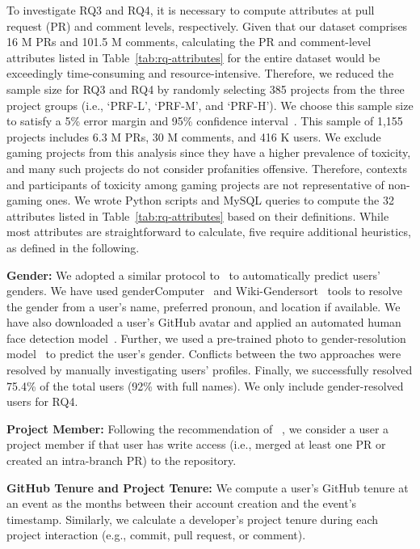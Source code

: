 To investigate RQ3 and RQ4, it is necessary to compute attributes at pull request (PR) and comment levels, respectively. Given that our dataset comprises 16 M PRs and 101.5 M comments, calculating the PR and comment-level attributes listed in Table~\ref{tab:rq-attributes} 
for the entire dataset would be exceedingly time-consuming and resource-intensive. Therefore, we reduced the sample size for RQ3 and RQ4 by randomly selecting 385 projects from the three project groups (i.e., `PRF-L', `PRF-M', and `PRF-H'). 
We choose this sample size to satisfy a 5\% error margin and 95\% confidence interval~\cite{cochran1977sampling}. This sample of 1,155 projects includes 6.3 M PRs, 30 M comments, and 416 K users. We exclude gaming projects from this analysis since they have a higher prevalence of toxicity, and many such projects do not consider profanities offensive. Therefore, contexts and participants of toxicity among gaming projects are not representative of non-gaming ones.
We wrote Python scripts and MySQL queries to compute the 32 attributes listed in Table~\ref{tab:rq-attributes} based on their definitions. While most attributes are straightforward to calculate, five require additional heuristics, as defined in the following.


    \textbf{Gender: }
    We adopted a similar protocol to~\citet{sultana2022code} to automatically predict users' genders. We have used genderComputer~\cite{vasilescu2014gender} and Wiki-Gendersort~\cite{berube2020wiki} tools to resolve the gender from a user's name, preferred pronoun, and location if available. We have also downloaded a user's GitHub avatar and applied an automated human face detection model~\cite{goyal2017face}. Further, we used a pre-trained photo to gender-resolution model~\cite{eidinger2014age} to predict the user's gender. Conflicts between the two approaches were resolved by manually investigating users' profiles.
 Finally, we successfully resolved 75.4\% of the total users (92\% with full names). We only include gender-resolved users for RQ4. 

 \textbf {Project Member:}
 Following the recommendation of ~\citet{gousios2012ghtorrent}, we consider a user a project member if that user has write access (i.e., merged at least one PR or created an intra-branch PR) to the repository.


 \textbf{GitHub Tenure and Project Tenure:}
We compute a user's GitHub tenure at an event as the months between their account creation and the event's timestamp. Similarly, we calculate a developer's project tenure during each project interaction (e.g., commit, pull request, or comment). 

